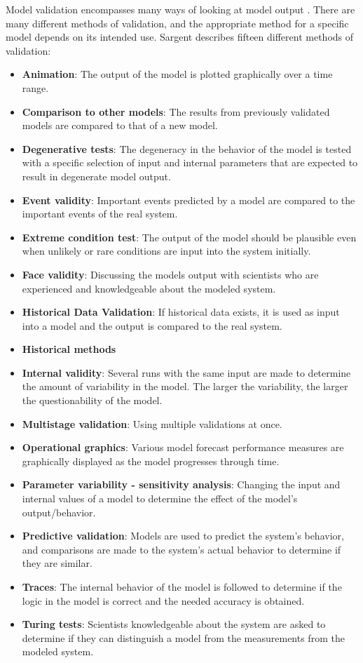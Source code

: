 Model validation encompasses many ways of looking at model output
\citep{Sargent2004}. There are many different methods of validation, and the
appropriate method for a specific model depends on its intended use. Sargent
\citet{Sargent2004} describes fifteen different methods of validation:
\begin{itemize}
  \item \textbf{Animation}: The output of the model is plotted graphically
  over a time range.
  \item \textbf{Comparison to other models}: The results from previously
  validated models are compared to that of a new model.
  \item \textbf{Degenerative tests}: The degeneracy in the behavior of the model
  is tested with a specific selection of input and internal parameters that are
  expected to result in degenerate model output.
  \item \textbf{Event validity}: Important events predicted by a model are
  compared to the important events of the real system.
  \item \textbf{Extreme condition test}: The output of the model should be
  plausible even when unlikely or rare conditions are input into the system
  initially.
  \item \textbf{Face validity}: Discussing the models output with scientists who
  are experienced and knowledgeable about the modeled system.
  \item \textbf{Historical Data Validation}: If historical data exists, it
  is used as input into a model and the output is compared to the real
  system.
  \item \textbf{Historical methods}
  \item \textbf{Internal validity}: Several runs with the same input are made to
  determine the amount of variability in the model. The larger the variability,
  the larger the questionability of the model. 
  \item \textbf{Multistage validation}: Using multiple validations at once.
  \item \textbf{Operational graphics}: Various model forecast performance
  measures are graphically displayed as the model progresses through time.
  \item \textbf{Parameter variability - sensitivity analysis}: Changing the
  input and internal values of a model to determine the effect of the model's
  output/behavior.
  \item \textbf{Predictive validation}: Models are used to predict the system's
  behavior, and comparisons are made to the system's actual behavior to
  determine if they are similar.
  \item \textbf{Traces}: The internal behavior of the model is followed to
  determine if the logic in the model is correct and the needed accuracy is
  obtained.
  \item \textbf{Turing tests}: Scientists knowledgeable about the system are
  asked to determine if they can distinguish a model from the measurements from the
  modeled system.
\end{itemize}

